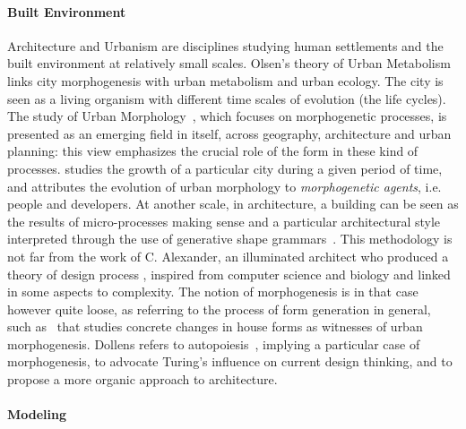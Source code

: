 \paragraph{Built Environment}{}

Architecture and Urbanism are disciplines studying human settlements and the built environment at relatively small scales. Olsen's theory of Urban Metabolism \cite{olsen1982urban} links city morphogenesis with urban metabolism and urban ecology. The city is seen as a living organism with different time scales of evolution (the life cycles). The study of Urban Morphology~\cite{moudon1997urban}, which focuses on morphogenetic processes, is presented as an emerging field in itself, across geography, architecture and urban planning: this view emphasizes the crucial role of the form in these kind of processes. \cite{burke1972dublin} studies the growth of a particular city during a given period of time, and attributes the evolution of urban morphology to \emph{morphogenetic agents}, i.e. people and developers. At another scale, in architecture, a building can be seen as the results of micro-processes making sense and a particular architectural style interpreted through the use of generative shape grammars~\cite{ceccarini2001essai}. This methodology is not far from the work of C. Alexander, an illuminated architect who produced a theory of design process \cite{mehaffy2007notes}, inspired from computer science and biology and linked in some aspects to complexity. The notion of morphogenesis is in that case however quite loose, as referring to the process of form generation in general, such as~\cite{whitehand1999urban} that studies concrete changes in house forms as witnesses of urban morphogenesis. Dollens refers to autopoiesis~\cite{dollens2014alan}, implying a particular case of morphogenesis, to advocate Turing's influence on current design thinking, and to propose a more organic approach to architecture.

\cite{desmarais1992premisses}
\cite{levy2005formes}




\paragraph{Modeling}{}

